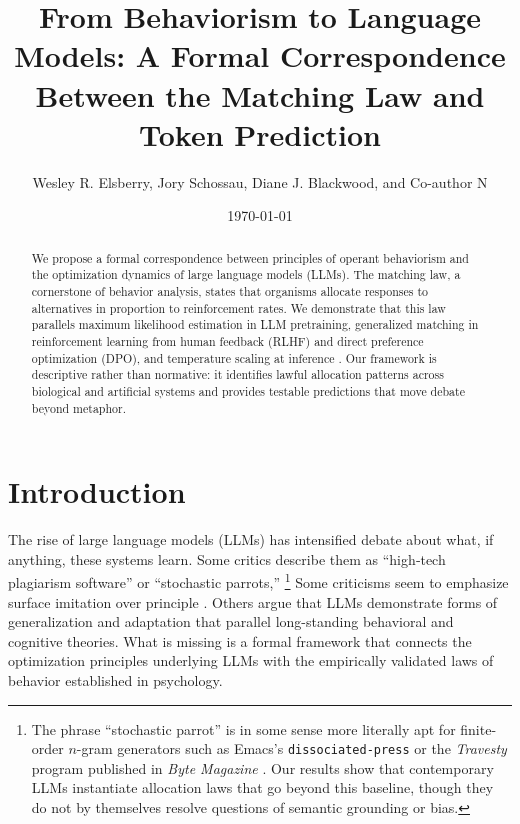 \documentclass[11pt]{article}
\title{From Behaviorism to Language Models: A Formal Correspondence Between the Matching Law and Token Prediction}
\author{Wesley R. Elsberry, Jory Schossau, Diane J. Blackwood, and Co-author N}
\date{\today}
\begin{document}
\maketitle

\begin{abstract}
We propose a formal correspondence between principles of operant behaviorism and the optimization dynamics of large language models (LLMs). The matching law, a cornerstone of behavior analysis, states that organisms allocate responses to alternatives in proportion to reinforcement rates. We demonstrate that this law parallels maximum likelihood estimation in LLM pretraining, generalized matching in reinforcement learning from human feedback (RLHF) and direct preference optimization (DPO), and temperature scaling at inference \citep{guo2017calibration}. Our framework is descriptive rather than normative: it identifies lawful allocation patterns across biological and artificial systems and provides testable predictions that move debate beyond metaphor.
\end{abstract}

\section{Introduction}
The rise of large language models (LLMs) has intensified debate about
what, if anything, these systems learn. Some critics describe them as
“high‑tech plagiarism software” or “stochastic parrots,”
\footnote{The phrase ``stochastic parrot'' is in some sense more literally apt
for finite-order $n$-gram generators such as Emacs’s
\texttt{dissociated-press} or the \emph{Travesty} program published in
\emph{Byte Magazine} \citep{kenner1984travesty}. Our results show that contemporary LLMs
instantiate allocation laws that go beyond this baseline, though they do not by
themselves resolve questions of semantic grounding or bias.}
Some criticisms seem to emphasize
surface imitation over principle
\citep{bender2021dangers,chomsky2023nytimes}. Others argue that LLMs
demonstrate forms of generalization and adaptation that parallel
long-standing behavioral and cognitive theories. What is missing is a
formal framework that connects the optimization principles underlying
LLMs with the empirically validated laws of behavior established in
psychology.
\end{document}
